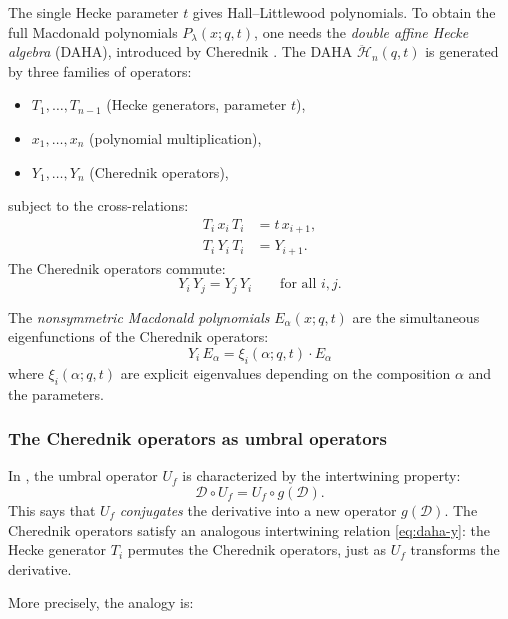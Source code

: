 \documentclass[11pt]{amsart}
\theoremstyle{definition}
\newcommand{\cD}{\mathcal{D}}
\newcommand{\cH}{\mathcal{H}}
\newcommand{\DAHA}{\ddot{\cH}}
\begin{document}
The single Hecke parameter $t$ gives Hall--Littlewood polynomials.
To obtain the full Macdonald polynomials $P_\lambda(x; q, t)$, one
needs the \emph{double affine Hecke algebra} (DAHA), introduced by
Cherednik \cite{Cherednik}. The DAHA $\DAHA_n(q,t)$ is generated by
three families of operators:
\begin{itemize}
  \item $T_1, \dots, T_{n-1}$ (Hecke generators, parameter $t$),
  \item $x_1, \dots, x_n$ (polynomial multiplication),
  \item $Y_1, \dots, Y_n$ (Cherednik operators),
\end{itemize}
subject to the cross-relations:
\begin{align}
  T_i\, x_i\, T_i &= t\, x_{i+1}, \label{eq:daha-x} \\
  T_i\, Y_i\, T_i &= Y_{i+1}. \label{eq:daha-y}
\end{align}
The Cherednik operators commute:
\begin{equation}\label{eq:cherednik-commute}
  Y_i\, Y_j = Y_j\, Y_i \qquad \text{for all } i, j.
\end{equation}

The \emph{nonsymmetric Macdonald polynomials}
$E_\alpha(x; q, t)$ are the simultaneous eigenfunctions of the
Cherednik operators:
\[
  Y_i\, E_\alpha = \xi_i(\alpha; q, t) \cdot E_\alpha
\]
where $\xi_i(\alpha; q, t)$ are explicit eigenvalues depending on
the composition $\alpha$ and the parameters.

\subsubsection{The Cherednik operators as umbral operators}

In \cite{Langer}, the umbral operator $U_f$ is characterized by the
intertwining property:
\[
  \cD \circ U_f = U_f \circ g(\cD).
\]
This says that $U_f$ \emph{conjugates} the derivative into a new
operator $g(\cD)$. The Cherednik operators satisfy an analogous
intertwining relation \eqref{eq:daha-y}: the Hecke generator $T_i$
permutes the Cherednik operators, just as $U_f$ transforms the
derivative.

More precisely, the analogy is:
\end{document}
